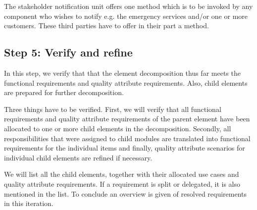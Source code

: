 \npar The stakeholder notification unit offers one method
 which is to be invoked by any component who
wishes to notify e.g. the emergency services and/or one or more customers. These
third parties have to offer in their part a  method.

\subsection{Step 5: Verify and refine}
\label{add:it1/verification}

\npar In this step, we verify that that the element decomposition thus far meets
the functional requirements and quality attribute requirements. Also, child
elements are prepared for further decomposition.

\npar Three things have to be verified. First, we will verify that all
functional requirements and quality attribute requirements of the parent element
have been allocated to one or more child elements in the decomposition.
Secondly, all responsibilities that were assigned to child modules are
translated into functional requirements for the individual items and finally,
quality attribute scenarios for individual child elements are refined if
necessary.

\npar We will list all the child elements, together with their allocated use
cases and quality attribute requirements. If a requirement is split or
delegated, it is also mentioned in the list. To conclude an overview is given of
resolved requirements in this iteration.

